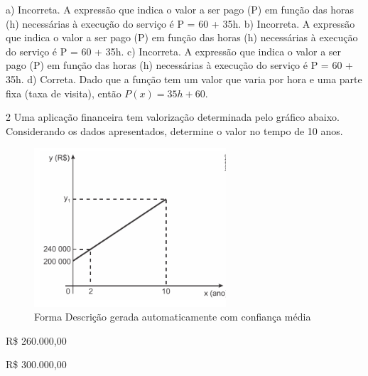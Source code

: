 \begin{escolha}
\begin{boxmedio}
\begin{boxmedio}
{\begin{boxpeq}
\begin{boxpeq}
{\begin{boxpeq}
\begin{boxmedio}
\begin{boxmedio}
\begin{boxpeq}
\begin{boxmedio}
\begin{boxpeq}
\begin{boxpeq}
\begin{boxpeq}
\begin{boxpeq}
\begin{boxmedio}
{\begin{boxmedio}
\begin{boxmedio}
\begin{boxpeq}
\begin{boxmedio}
\begin{boxpeq}
\begin{boxpeq}
\begin{boxpeq}
\begin{escolha}
{\begin{boxmedio}
\begin{boxpeq}
\begin{boxpeq}
\begin{boxpeq}
\begin{boxpeq}
\begin{boxpeq}
\begin{boxmedio}
\begin{boxpeq}
\begin{boxpeq}
\begin{boxpeq}
{\begin{boxpeq}
\begin{boxmedio}
\begin{boxpeq}
\begin{boxpeq}
\begin{boxpeq}
{\begin{boxpeq}
\begin{boxmedio}
{\begin{boxpeq}
\begin{boxpeq}
\begin{boxmedio}
\begin{boxmedio}
\begin{boxpeq}
\begin{boxpeq}
{\begin{boxpeq}
{a) Incorreta. A expressão que indica o valor a ser pago (P) em função das
horas (h) necessárias à execução do serviço é P = 60 + 35h.   
b) Incorreta. A expressão que indica o valor a ser pago (P) em função das
horas (h) necessárias à execução do serviço é P = 60 + 35h.  
c) Incorreta. A expressão que indica o valor a ser pago (P) em função das
horas (h) necessárias à execução do serviço é P = 60 + 35h.  
d) Correta. Dado que a função tem um valor que varia por hora e uma parte fixa (taxa
de visita), então $P(x)=35h+60$.}

\num{2} Uma aplicação financeira tem valorização determinada pelo gráfico abaixo.
Considerando os dados apresentados, determine o valor no tempo de 10 anos.

\begin{figure}
\centering
\includegraphics[width=2.80858in,height=2.3252in]{./_SAEB_9_MAT/media/image155.png}
\caption{Forma Descrição gerada automaticamente com confiança média}
\end{figure}

\begin{escolha}

\item R\$ 260.000,00

\item R\$ 300.000,00


\end{escolha}
\end{boxpeq}}
\end{boxpeq}
\end{boxpeq}
\end{boxmedio}
\end{boxmedio}
\end{boxpeq}
\end{boxpeq}}
\end{boxmedio}
\end{boxpeq}}
\end{boxpeq}
\end{boxpeq}
\end{boxpeq}
\end{boxmedio}
\end{boxpeq}}
\end{boxpeq}
\end{boxpeq}
\end{boxpeq}
\end{boxmedio}
\end{boxpeq}
\end{boxpeq}
\end{boxpeq}
\end{boxpeq}
\end{boxpeq}
\end{boxmedio}}
\end{escolha}
\end{boxpeq}
\end{boxpeq}
\end{boxpeq}
\end{boxmedio}
\end{boxpeq}
\end{boxmedio}
\end{boxmedio}}
\end{boxmedio}
\end{boxpeq}
\end{boxpeq}
\end{boxpeq}
\end{boxpeq}
\end{boxmedio}
\end{boxpeq}
\end{boxmedio}
\end{boxmedio}
\end{boxpeq}}
\end{boxpeq}
\end{boxpeq}}
\end{boxmedio}
\end{boxmedio}
\end{escolha}
